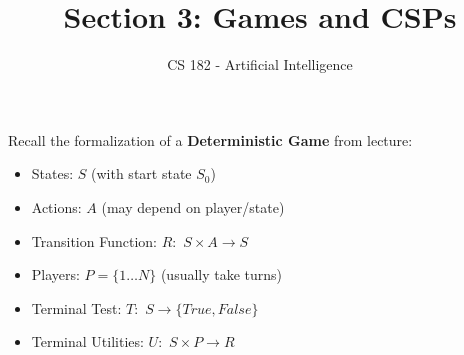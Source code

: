 \documentclass[a4paper]{article}
\title{Section 3: Games and CSPs}
\author{CS 182 - Artificial Intelligence}
\date{}
\begin{document}
\maketitle


\noindent Recall the formalization of a \textbf{Deterministic Game} from lecture:
\begin{itemize}
\setlength\itemsep{0.2em}
\item States: $S$ (with start state $S_0$)
\item Actions: $A$ (may depend on player/state)
\item Transition Function: $R:$ $S \times A \rightarrow S$
\item Players: $P=\{1 \ldots N\}$ (usually take turns)
\item Terminal Test: $T:$ $S \rightarrow \{True,False\}$
\item Terminal Utilities: $U:$ $S \times P \rightarrow R$
\end{itemize}
\end{document}
